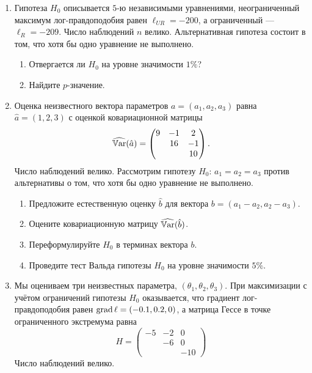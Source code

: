 \begin{enumerate}[resume]
    \item Гипотеза $H_0$ описывается $5$-ю независимыми уравнениями, неограниченный максимум лог-правдоподобия равен $\ell_{UR} = -200$, а ограниченный — $\ell_R=-209$.
    Число наблюдений $n$ велико. Альтернативная гипотеза состоит в том, что хотя бы одно уравнение не выполнено.

    \begin{enumerate}
        \item Отвергается ли $H_0$ на уровне значимости $1\%$?
        \item Найдите $p$-значение. 
    \end{enumerate}
    
    \item Оценка неизвестного вектора параметров $a = (a_1, a_2, a_3)$  равна $\hat a = (1, 2, 3)$ с оценкой ковариационной матрицы
    \[
    \widehat{\operatorname{\mathbb{V}ar}}(\hat a) = \begin{pmatrix}
        9 & -1 & 2 \\
         & 16 & -1 \\
         & & 10 \\
    \end{pmatrix}.
    \]
    Число наблюдений велико.
    Рассмотрим гипотезу $H_0$: $a_1 = a_2 = a_3$ против альтернативы о том, что хотя бы одно уравнение не выполнено.
    \begin{enumerate}
        \item Предложите естественную оценку $\hat b$ для вектора $b = (a_1 - a_2, a_2 - a_3)$.
        \item Оцените ковариационную матрицу $\widehat{\operatorname{\mathbb{V}ar}}(\hat b)$.
        \item Переформулируйте $H_0$ в терминах вектора $b$.
        \item Проведите тест Вальда гипотезы $H_0$ на уровне значимости $5\%$.
    \end{enumerate}
    
    \item Мы оцениваем три неизвестных параметра, $(\theta_1, \theta_2, \theta_3)$. 
    При максимизации с учётом ограничений гипотезы $H_0$ оказывается, что градиент лог-правдоподобия равен $\operatorname{grad} \ell = (-0.1, 0.2, 0)$,
    а матрица Гессе в точке ограниченного экстремума равна 
    \[
    H = \begin{pmatrix}
        -5 & -2 & 0 \\
         & -6 & 0 \\
         & & -10
    \end{pmatrix}
    \]
    Число наблюдений велико. 


\end{enumerate}
